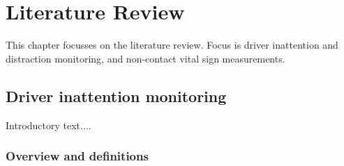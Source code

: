 \documentclass[11pt, parskip=half*,twoside=false]{scrbook}
\begin{document}


\chapter{Literature Review} \label{ch:litreview}
This chapter focusses on the literature review. Focus is driver inattention and distraction monitoring, and non-contact vital sign measurements. 

\section{Driver inattention monitoring} \label{sec:distraction}
Introductory text....

\subsection{Overview and definitions} \label{ssec:overview}
%
\end{document}
